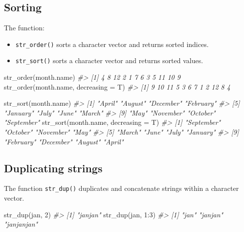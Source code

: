 \documentclass[
]{book}
\newenvironment{Shaded}{\begin{snugshade}}{\end{snugshade}}
\newcommand{\AttributeTok}[1]{\textcolor[rgb]{0.77,0.63,0.00}{#1}}
\newcommand{\CommentTok}[1]{\textcolor[rgb]{0.56,0.35,0.01}{\textit{#1}}}
\newcommand{\DecValTok}[1]{\textcolor[rgb]{0.00,0.00,0.81}{#1}}
\newcommand{\FunctionTok}[1]{\textcolor[rgb]{0.00,0.00,0.00}{#1}}
\newcommand{\NormalTok}[1]{#1}
\newcommand{\SpecialCharTok}[1]{\textcolor[rgb]{0.00,0.00,0.00}{#1}}
\newcommand{\StringTok}[1]{\textcolor[rgb]{0.31,0.60,0.02}{#1}}
\providecommand{\tightlist}{%
  \setlength{\itemsep}{0pt}\setlength{\parskip}{0pt}}
\begin{document}
\hypertarget{sorting}{%
\subsection{Sorting}\label{sorting}}

The function:

\begin{itemize}
\tightlist
\item
  \texttt{str\_order()} sorts a character vector and returns sorted indices.
\item
  \texttt{str\_sort()} sorts a character vector and returns sorted values.
\end{itemize}

\begin{Shaded}
\begin{Highlighting}[]
\FunctionTok{str\_order}\NormalTok{(month.name)}
\CommentTok{\#\textgreater{}  [1]  4  8 12  2  1  7  6  3  5 11 10  9}
\FunctionTok{str\_order}\NormalTok{(month.name, }\AttributeTok{decreasing =}\NormalTok{ T)}
\CommentTok{\#\textgreater{}  [1]  9 10 11  5  3  6  7  1  2 12  8  4}

\FunctionTok{str\_sort}\NormalTok{(month.name)}
\CommentTok{\#\textgreater{}  [1] "April"     "August"    "December"  "February" }
\CommentTok{\#\textgreater{}  [5] "January"   "July"      "June"      "March"    }
\CommentTok{\#\textgreater{}  [9] "May"       "November"  "October"   "September"}
\FunctionTok{str\_sort}\NormalTok{(month.name, }\AttributeTok{decreasing =}\NormalTok{ T)}
\CommentTok{\#\textgreater{}  [1] "September" "October"   "November"  "May"      }
\CommentTok{\#\textgreater{}  [5] "March"     "June"      "July"      "January"  }
\CommentTok{\#\textgreater{}  [9] "February"  "December"  "August"    "April"}
\end{Highlighting}
\end{Shaded}

\hypertarget{duplicating-strings}{%
\subsection{Duplicating strings}\label{duplicating-strings}}

The function \texttt{str\_dup()} duplicates and concatenate strings within a character vector.

\begin{Shaded}
\begin{Highlighting}[]
\FunctionTok{str\_dup}\NormalTok{(}\StringTok{\textquotesingle{}jan\textquotesingle{}}\NormalTok{, }\DecValTok{2}\NormalTok{)}
\CommentTok{\#\textgreater{} [1] "janjan"}
\FunctionTok{str\_dup}\NormalTok{(}\StringTok{\textquotesingle{}jan\textquotesingle{}}\NormalTok{, }\DecValTok{1}\SpecialCharTok{:}\DecValTok{3}\NormalTok{)}
\CommentTok{\#\textgreater{} [1] "jan"       "janjan"    "janjanjan"}
\end{Highlighting}
\end{Shaded}
\end{document}
